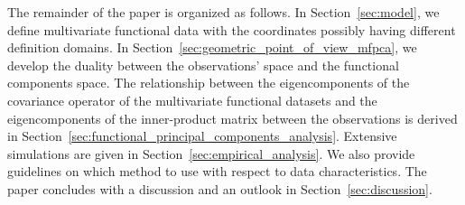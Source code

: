 The remainder of the paper is organized as follows. In Section~\ref{sec:model}, we define multivariate functional data with the coordinates possibly having different definition domains. In Section~\ref{sec:geometric_point_of_view_mfpca}, we develop the duality between the observations' space and the functional components space. The relationship between the eigencomponents of the covariance operator of the multivariate functional datasets and the eigencomponents of the inner-product matrix between the observations is derived in Section~\ref{sec:functional_principal_components_analysis}. Extensive simulations are given in Section~\ref{sec:empirical_analysis}. We also provide guidelines on which method to use with respect to data characteristics. The paper concludes with a discussion and an outlook in Section~\ref{sec:discussion}.

